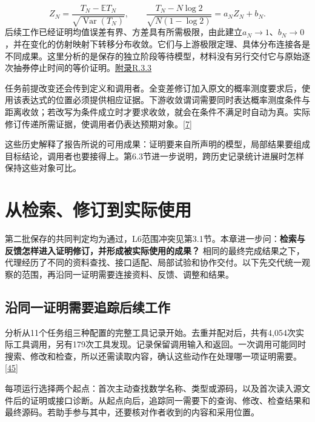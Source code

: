 \[
Z_N=\frac{T_N-\mathbb E T_N}{\sqrt{\operatorname{Var}(T_N)}},\qquad
\frac{T_N-N\log2}{\sqrt{N(1-\log2)}}=a_NZ_N+b_N.
\]
后续工作已经证明均值误差有界、方差具有所需极限，由此建立$a_N\to1$、$b_N\to0$，并在变化的仿射映射下转移分布收敛。它们与上游极限定理、具体分布连接各是不同成果。这里分析的是保存的独立阶段等待模型，材料没有另行交付它与原始逐次抽券停止时间的等价证明。\href{zh-appendix.pdf\#r3-3}{附录R.3.3}

任务前提改变还会传到定义和调用者。全变差修订加入原文的概率测度要求后，使用该表达式的位置必须提供相应证据。下游收敛谓词需要同时表达概率测度条件与距离收敛；若改写为条件成立时才要求收敛，就会在条件不满足时自动为真。实际修订传递所需证据，使调用者仍表达预期对象。\hyperlink{ref-7}{\mbox{[7]}}

这些历史解释了报告所说的可用成果：证明要来自所声明的模型，局部结果要组成目标结论，调用者也要接得上。第6.3节进一步说明，跨历史记录统计进展时怎样保持这些对象可比。

\section[从检索、修订到实际使用]{\texorpdfstring{\protect\hypertarget{section-5}{}从检索、修订到实际使用}{从检索、修订到实际使用}}
第二批保存的共同判定均为通过，L6范围冲突见第3.1节。本章进一步问：\textbf{检索与反馈怎样进入证明修订，并形成被实际使用的成果？} 相同的最终完成结果之下，代理经历了不同的资料查找、接口适配、局部试验和协作交付。以下先交代统一观察的范围，再沿同一证明需要连接资料、反馈、调整和结果。

\subsection[沿同一证明需要追踪后续工作]{\texorpdfstring{\protect\hypertarget{section-5-1}{}沿同一证明需要追踪后续工作}{沿同一证明需要追踪后续工作}}
分析从11个任务组三种配置的完整工具记录开始。去重并配对后，共有4,054次实际工具调用，另有179次工具发现。记录保留调用输入和返回。一次调用可能同时搜索、修改和检查，所以还需读取内容，确认这些动作在处理哪一项证明需要。\hyperlink{ref-45}{\mbox{[45]}}

每项运行选择两个起点：首次主动查找数学名称、类型或源码，以及首次读入源文件后的证明或接口诊断。从起点向后，追踪同一需要下的查询、修改、检查结果和最终源码。若助手参与其中，还要核对作者收到的内容和采用位置。

